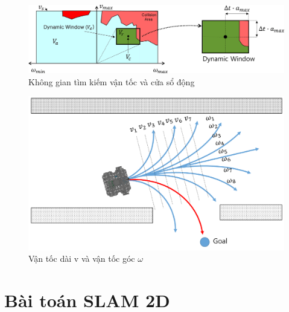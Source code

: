 {{\begin{figure}[htbp]
  \centering
  \includegraphics[width=1\linewidth]{figures/DWA.png}
  \caption{Không gian tìm kiếm vận tốc và cửa sổ động}
  \label{fig:dwa}
\end{figure}

\begin{figure}[htbp]
  \centering
  \includegraphics[width=0.8\linewidth]{figures/dwa-search-velocity.png}
  \caption{Vận tốc dài v và vận tốc góc $\omega$}
  \label{fig:dwa-search-velocity}
\end{figure}

\section{Bài toán SLAM 2D}




}}
